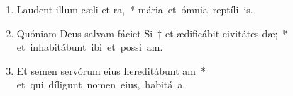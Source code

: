\begin{flushleft}
\begin{enumerate}[leftmargin=*]
\item Laudent illum cæli et ra,~* \mbox{mária et ómnia reptíli  is.}

\item Quóniam Deus salvam fáciet Si~† et ædificábit civitátes dæ;~* \mbox{et inhabitábunt ibi et possi am.}

\item Et semen servórum eius hereditábunt am~* \mbox{et qui díligunt nomen eius, habitá  a.}


\end{enumerate}
\end{flushleft}


